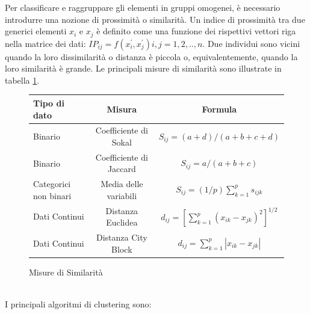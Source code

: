 Per classificare e raggruppare gli elementi in gruppi omogenei, è necessario introdurre una nozione di prossimità o similarità. Un indice di prossimità tra due generici elementi $x_i$ e $x_j$ è definito come una funzione dei rispettivi vettori riga nella matrice dei dati: $IP_{ij} = f(x_{i}^{'},x_{j}^{'}) i,j=1,2,..,n$. Due individui sono vicini quando la loro dissimilarità o distanza è piccola o, equivalentemente, quando la loro similarità è grande. Le principali misure di similarità sono illustrate in tabella \ref{TAB:SIMILARITA'}.
\begin{figure}[h!]
	\centering
	\begin{tabular}{ l || c || c || }
		\multicolumn{1}{l||}{Tipo di dato} &  
		\multicolumn{1}{c||}{Misura} &
		\multicolumn{1}{c||}{Formula}\\
		\hline
		\hline
		Binario					&	Coefficiente di Sokal		&	$S_{ij}=(a+d)/(a+b+c+d)$	\\
		Binario					&	Coefficiente di Jaccard		& 	$S_{ij}=a/(a+b+c)$\\
		Categorici non binari	& 	Media delle variabili		&	$S_{ij}=(1/p) \sum_{k=1}^{p} s_{ijk}$\\
		Dati Continui			& 	Distanza Euclidea			&	$d_{ij}=[\sum_{k=1}^{p}(x_{ik}-x_{jk})^2]^{1/2}$\\
		Dati Continui			& 	Distanza City Block			&	$d_{ij}=\sum_{k=1}^{p}|x_{ik}-x_{jk}|$\\
		
	\end{tabular}
	\vspace{0.1cm}
	\caption{Misure di Similarità}
	\label{TAB:SIMILARITA'}
\end{figure}
\\
I principali algoritmi di clustering sono:
